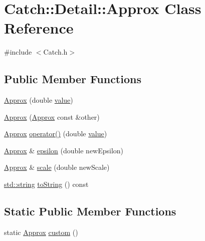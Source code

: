 \hypertarget{class_catch_1_1_detail_1_1_approx}{}\section{Catch\+:\+:Detail\+:\+:Approx Class Reference}
\label{class_catch_1_1_detail_1_1_approx}


{\ttfamily \#include $<$Catch.\+h$>$}

\subsection*{Public Member Functions}
\begin{DoxyCompactItemize}
\item 
\hyperlink{class_catch_1_1_detail_1_1_approx_a1a8618ea8db08c66bd3d9fe8f74b957a}{Approx} (double \hyperlink{_s_d_l__opengl__glext_8h_a8ad81492d410ff2ac11f754f4042150f}{value})
\item 
\hyperlink{class_catch_1_1_detail_1_1_approx_a807330c63266fc914abdf6e461255a54}{Approx} (\hyperlink{class_catch_1_1_detail_1_1_approx}{Approx} const \&other)
\item 
\hyperlink{class_catch_1_1_detail_1_1_approx}{Approx} \hyperlink{class_catch_1_1_detail_1_1_approx_a48c9cbc28a05dc9dc8c3973b9eae2268}{operator()} (double \hyperlink{_s_d_l__opengl__glext_8h_a8ad81492d410ff2ac11f754f4042150f}{value})
\item 
\hyperlink{class_catch_1_1_detail_1_1_approx}{Approx} \& \hyperlink{class_catch_1_1_detail_1_1_approx_a05c50c3ad0a971fab19345b5d94979a9}{epsilon} (double new\+Epsilon)
\item 
\hyperlink{class_catch_1_1_detail_1_1_approx}{Approx} \& \hyperlink{class_catch_1_1_detail_1_1_approx_acd80f0737bf38112beacd5ca95bef113}{scale} (double new\+Scale)
\item 
\hyperlink{_s_d_l__opengl__glext_8h_ae84541b4f3d8e1ea24ec0f466a8c568b}{std\+::string} \hyperlink{class_catch_1_1_detail_1_1_approx_adeb74b73506b3f6b2ba72aea15168fbe}{to\+String} () const 
\end{DoxyCompactItemize}
\subsection*{Static Public Member Functions}
\begin{DoxyCompactItemize}
\item 
static \hyperlink{class_catch_1_1_detail_1_1_approx}{Approx} \hyperlink{class_catch_1_1_detail_1_1_approx_aaf86dc0ee92272ac2d9839197a07951d}{custom} ()
\end{DoxyCompactItemize}
